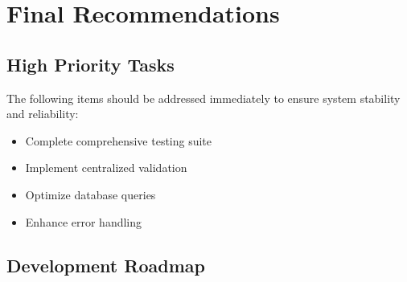 \chapter{Final Recommendations}

\section{High Priority Tasks}

\begin{tcolorbox}[
    enhanced,
    title={Critical Items},
    attach boxed title to top left,
    boxed title style={
        colback=danger!50,
        colframe=danger!50,
        arc=0mm,
    },
    colback=white,
    colframe=danger!50,
    arc=0mm,
    fonttitle=\bfseries
]
    The following items should be addressed immediately to ensure system stability and reliability:
    \begin{itemize}
        \item Complete comprehensive testing suite
        \item Implement centralized validation
        \item Optimize database queries
        \item Enhance error handling
    \end{itemize}
\end{tcolorbox}

\section{Development Roadmap}

